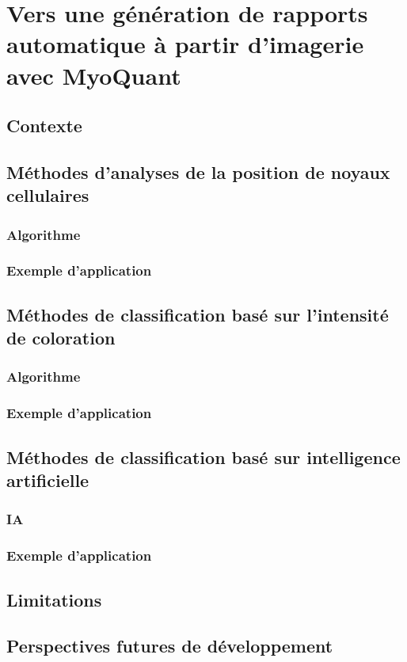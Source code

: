 \chapter{Vers une génération de rapports automatique à partir d’imagerie avec MyoQuant}

\section{Contexte}
\section{Méthodes d'analyses de la position de noyaux cellulaires}
\subsection{Algorithme}
\subsection{Exemple d'application}
\section{Méthodes de classification basé sur l'intensité de coloration}
\subsection{Algorithme}
\subsection{Exemple d'application}
\section{Méthodes de classification basé sur intelligence artificielle}
\subsection{IA}
\subsection{Exemple d'application}
\section{Limitations}
\section{Perspectives futures de développement}